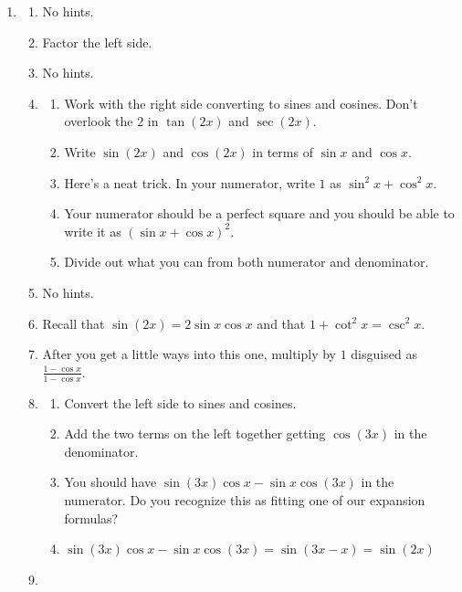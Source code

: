 \documentclass[english]{book}
\begin{document}
\begin{enumerate}
    \item \begin{enumerate} %
        \item No hints.
        \item Factor the left side.
        \item No hints.
        \item \begin{enumerate}[\hspace{1cm}a)]
                \item Work with the right side converting to sines and cosines. Don't overlook the $2$ in $\tan(2x)$ and $\sec(2x)$.
                \item Write $\sin(2x)$ and $\cos(2x)$ in terms of $\sin x$ and $\cos x$.
                \item Here's a neat trick. In your numerator, write $1$ as $\sin^{2} x + \cos^{2} x$.
                \item Your numerator should be a perfect square and you should be able to write it as $(\sin x + \cos x)^2$.
                \item Divide out what you can from both numerator and denominator.
              \end{enumerate}
        \item No hints.
        \item Recall that $\sin(2x) = 2 \sin x \cos x$ and that $1 + \cot^{2}x = \csc^{2}x$.
        \item After you get a little ways into this one, multiply by $1$ disguised as $\frac{1 - \cos x}{1 - \cos x}$.
        \item \begin{enumerate}[\hspace{1cm}a)]
                \item Convert the left side to sines and cosines.
                \item Add the two terms on the left together getting $\cos(3x)$ in the denominator.
                \item You should have $\sin(3x) \cos x - \sin x \cos(3x)$ in the numerator. Do you recognize this as fitting one of our expansion formulas?
                \item $\sin(3x) \cos x - \sin x \cos(3x) = \sin(3x-x) = \sin(2x)$
              \end{enumerate}
        \item \begin{enumerate}[\hspace{1cm}a)]

\end{enumerate}
\end{enumerate}
\end{enumerate}
\end{document}
